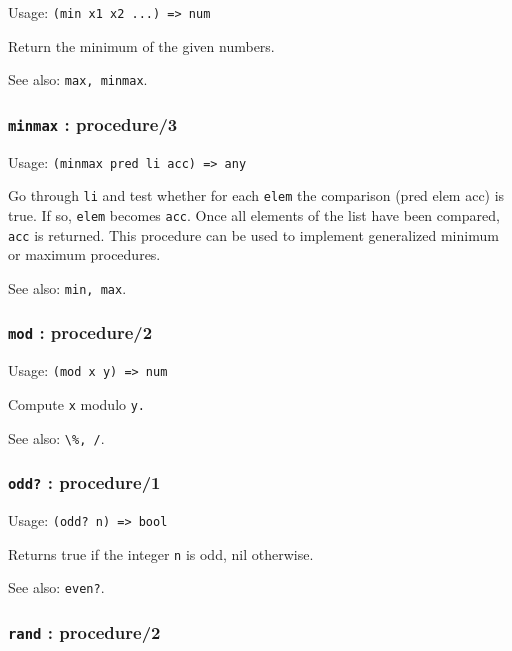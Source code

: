 \documentclass[
]{article}
\newcommand{\passthrough}[1]{#1}
\begin{document}
Usage: \passthrough{\lstinline!(min x1 x2 ...) => num!}

Return the minimum of the given numbers.

See also: \passthrough{\lstinline!max, minmax!}.

\hypertarget{minmax-procedure3}{%
\subsubsection{\texorpdfstring{\texttt{minmax} :
procedure/3}{minmax : procedure/3}}\label{minmax-procedure3}}

Usage: \passthrough{\lstinline!(minmax pred li acc) => any!}

Go through \passthrough{\lstinline!li!} and test whether for each
\passthrough{\lstinline!elem!} the comparison (pred elem acc) is true.
If so, \passthrough{\lstinline!elem!} becomes
\passthrough{\lstinline!acc!}. Once all elements of the list have been
compared, \passthrough{\lstinline!acc!} is returned. This procedure can
be used to implement generalized minimum or maximum procedures.

See also: \passthrough{\lstinline!min, max!}.

\hypertarget{mod-procedure2}{%
\subsubsection{\texorpdfstring{\texttt{mod} :
procedure/2}{mod : procedure/2}}\label{mod-procedure2}}

Usage: \passthrough{\lstinline!(mod x y) => num!}

Compute \passthrough{\lstinline!x!} modulo \passthrough{\lstinline!y.!}

See also: \passthrough{\lstinline!\%, /!}.

\hypertarget{odd-procedure1}{%
\subsubsection{\texorpdfstring{\texttt{odd?} :
procedure/1}{odd? : procedure/1}}\label{odd-procedure1}}

Usage: \passthrough{\lstinline!(odd? n) => bool!}

Returns true if the integer \passthrough{\lstinline!n!} is odd, nil
otherwise.

See also: \passthrough{\lstinline!even?!}.

\hypertarget{rand-procedure2}{%
\subsubsection{\texorpdfstring{\texttt{rand} :
procedure/2}{rand : procedure/2}}\label{rand-procedure2}}
\end{document}
